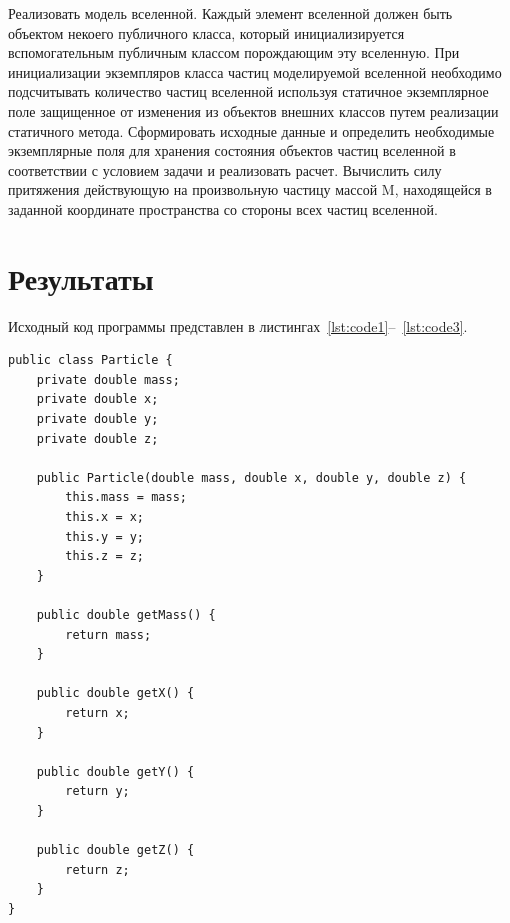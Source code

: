 \documentclass[a4paper, 14pt]{extarticle}
\begin{document}
Реализовать модель вселенной. Каждый элемент вселенной должен быть объектом
некоего публичного класса, который инициализируется вспомогательным публичным
классом порождающим эту вселенную. При инициализации экземпляров класса частиц
моделируемой вселенной необходимо подсчитывать количество частиц вселенной используя
статичное экземплярное поле защищенное от изменения из объектов внешних классов путем
реализации статичного метода. Сформировать исходные данные и определить необходимые
экземплярные поля для хранения состояния объектов частиц вселенной в соответствии с
условием задачи и реализовать расчет.
Вычислить силу притяжения действующую на произвольную частицу массой M, 
находящейся в заданной координате пространства со стороны всех частиц вселенной.

\section{Результаты}\label{Sect::res}

Исходный код программы представлен в листингах~\ref{lst:code1}--~\ref{lst:code3}.

\begin{lstlisting}[language={},caption={класс Particle},label={lst:code1}]
public class Particle {
    private double mass;
    private double x;
    private double y;
    private double z;

    public Particle(double mass, double x, double y, double z) {
        this.mass = mass;
        this.x = x;
        this.y = y;
        this.z = z;
    }

    public double getMass() {
        return mass;
    }

    public double getX() {
        return x;
    }

    public double getY() {
        return y;
    }

    public double getZ() {
        return z;
    }
}    
\end{lstlisting}
\end{document}
